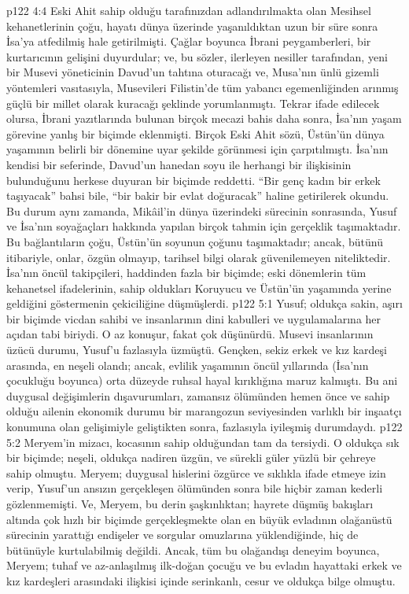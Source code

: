 \vs p122 4:4 Eski Ahit sahip olduğu tarafınızdan adlandırılmakta olan Mesihsel kehanetlerinin çoğu, hayatı dünya üzerinde yaşanıldıktan uzun bir süre sonra İsa’ya atfedilmiş hale getirilmişti. Çağlar boyunca İbrani peygamberleri, bir kurtarıcının gelişini duyurdular; ve, bu sözler, ilerleyen nesiller tarafından, yeni bir Musevi yöneticinin Davud’un tahtına oturacağı ve, Musa’nın ünlü gizemli yöntemleri vasıtasıyla, Musevileri Filistin’de tüm yabancı egemenliğinden arınmış güçlü bir millet olarak kuracağı şeklinde yorumlanmıştı. Tekrar ifade edilecek olursa, İbrani yazıtlarında bulunan birçok mecazi bahis daha sonra, İsa’nın yaşam görevine yanlış bir biçimde eklenmişti. Birçok Eski Ahit sözü, Üstün’ün dünya yaşamının belirli bir dönemine uyar şekilde görünmesi için çarpıtılmıştı. İsa’nın kendisi bir seferinde, Davud’un hanedan soyu ile herhangi bir ilişkisinin bulunduğunu herkese duyuran bir biçimde reddetti. “Bir genç kadın bir erkek taşıyacak” bahsi bile, “bir bakir bir evlat doğuracak” haline getirilerek okundu. Bu durum aynı zamanda, Mikâil’in dünya üzerindeki sürecinin sonrasında, Yusuf ve İsa’nın soyağaçları hakkında yapılan birçok tahmin için gerçeklik taşımaktadır. Bu bağlantıların çoğu, Üstün’ün soyunun çoğunu taşımaktadır; ancak, bütünü itibariyle, onlar, özgün olmayıp, tarihsel bilgi olarak güvenilemeyen niteliktedir. İsa’nın öncül takipçileri, haddinden fazla bir biçimde; eski dönemlerin tüm kehanetsel ifadelerinin, sahip oldukları Koruyucu ve Üstün’ün yaşamında yerine geldiğini göstermenin çekiciliğine düşmüşlerdi.
\vs p122 5:1 Yusuf; oldukça sakin, aşırı bir biçimde vicdan sahibi ve insanlarının dini kabulleri ve uygulamalarına her açıdan tabi biriydi. O az konuşur, fakat çok düşünürdü. Musevi insanlarının üzücü durumu, Yusuf’u fazlasıyla üzmüştü. Gençken, sekiz erkek ve kız kardeşi arasında, en neşeli olandı; ancak, evlilik yaşamının öncül yıllarında (İsa’nın çocukluğu boyunca) orta düzeyde ruhsal hayal kırıklığına maruz kalmıştı. Bu ani duygusal değişimlerin dışavurumları, zamansız ölümünden hemen önce ve sahip olduğu ailenin ekonomik durumu bir marangozun seviyesinden varlıklı bir inşaatçı konumuna olan gelişimiyle geliştikten sonra, fazlasıyla iyileşmiş durumdaydı.
\vs p122 5:2 Meryem’in mizacı, kocasının sahip olduğundan tam da tersiydi. O oldukça sık bir biçimde; neşeli, oldukça nadiren üzgün, ve sürekli güler yüzlü bir çehreye sahip olmuştu. Meryem; duygusal hislerini özgürce ve sıklıkla ifade etmeye izin verip, Yusuf’un ansızın gerçekleşen ölümünden sonra bile hiçbir zaman kederli gözlenmemişti. Ve, Meryem, bu derin şaşkınlıktan; hayrete düşmüş bakışları altında çok hızlı bir biçimde gerçekleşmekte olan en büyük evladının olağanüstü sürecinin yarattığı endişeler ve sorgular omuzlarına yüklendiğinde, hiç de bütünüyle kurtulabilmiş değildi. Ancak, tüm bu olağandışı deneyim boyunca, Meryem; tuhaf ve az\hyp{}anlaşılmış ilk\hyp{}doğan çocuğu ve bu evladın hayattaki erkek ve kız kardeşleri arasındaki ilişkisi içinde serinkanlı, cesur ve oldukça bilge olmuştu.
